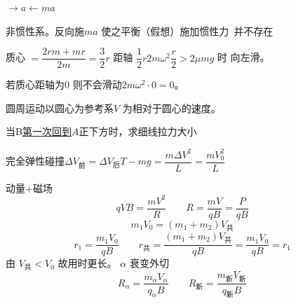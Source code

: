 \noindent $\to a$\quad $\leftarrow ma$

\noindent 非惯性系。反向施$ma$ 使之平衡（假想）\quad 施加惯性力\ 并不存在
\begin{problem}
\begin{solution}
质心 $=\dfrac{2rm+mr}{2m}=\dfrac32r$ 距轴 $\dfrac12r$\qquad $2m\omega^2\dfrac r2>2\mu mg$ 时 向左滑。

若质心距轴为0 则不会滑动\qquad $2m\omega^2\cdot0=0$。
\end{solution}
\end{problem}
\noindent 圆周运动以圆心为参考系\qquad $V$ 为相对于圆心的速度。
\begin{problem}
当B\underline{第一次回到$A$}正下方时，求细线拉力大小
\begin{solution}
完全弹性碰撞\qquad $\Delta V_{\text{前}}=\Delta V_{\text{后}}$\qquad $T-mg=\dfrac{m\Delta V^2}{L}=\dfrac{mV_0^2}{L}$
\end{solution}
\end{problem}
\noindent 动量+磁场
\[ qVB=\frac{mV^2}{R}\qquad R=\frac{mV}{qB}=\frac{P}{qB} \]
\[ m_1V_0=(m_1+m_2)V_{\text{共}} \]
\[ r_1=\frac{m_1V_0}{qB}\qquad r_{\text{共}}=\frac{(m_1+m_2)V_{\text{共}}}{qB}=\frac{m_1V_0}{qB}=r_1 \]
\noindent 由 $V_{\text{共}}<V_0$ 故用时更长。
\noindent $\alpha$ 衰变\quad 外切
\[ R_\alpha=\frac{m_\alpha V_\alpha}{q_\alpha B}\qquad R_{\text{新}}=\frac{m_{\text{新}}V_{\text{新}}}{q_{\text{新}}B} \]
